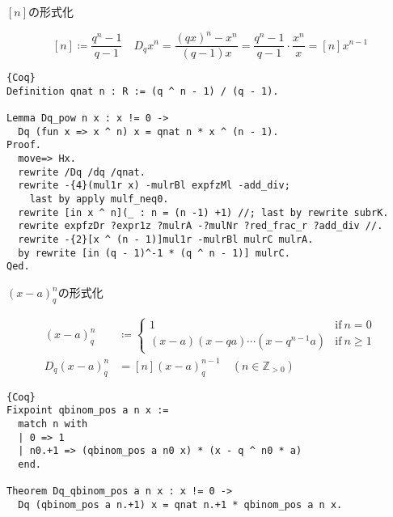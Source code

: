 \documentclass[dvipdfmx,cjk]{beamer}
\theoremstyle{mystyle}
\newcommand{\Z}{\mathbb{Z}}
\newcommand{\0}{\textbf{0}}
\begin{document}
\begin{frame}[fragile]{$[n]$の形式化}
	\begin{screen}
		\[
			[n] \coloneqq \frac{q^n - 1}{q - 1} \quad
			D_q x^n = \frac{(qx)^n - x^n}{(q - 1) x} = \frac{q^n - 1}{q - 1} \cdot \frac{x^n}{x}
							= [n] x^{n - 1}
		\]
	\end{screen} \pause
	\begin{lstlisting}{Coq}
Definition qnat n : R := (q ^ n - 1) / (q - 1).

Lemma Dq_pow n x : x != 0 ->
  Dq (fun x => x ^ n) x = qnat n * x ^ (n - 1).
Proof.
  move=> Hx.
  rewrite /Dq /dq /qnat.
  rewrite -{4}(mul1r x) -mulrBl expfzMl -add_div;
    last by apply mulf_neq0.
  rewrite [in x ^ n](_ : n = (n -1) +1) //; last by rewrite subrK.
  rewrite expfzDr ?expr1z ?mulrA -?mulNr ?red_frac_r ?add_div //.
  rewrite -{2}[x ^ (n - 1)]mul1r -mulrBl mulrC mulrA.
  by rewrite [in (q - 1)^-1 * (q ^ n - 1)] mulrC.
Qed. \end{lstlisting}
\end{frame}

\begin{frame}[fragile]{$(x - a)^n_q$の形式化}
	\begin{screen}
		\begin{align*}
			(x - a)^n_q &\coloneqq \begin{cases}
	                      1 & \text{if}\ n = 0 \\
	                      (x - a) (x - qa) \cdots (x - q^{n - 1} a) & \text{if}\ n \ge 1
	                    \end{cases} \\
			D_q (x - a)^n_q &= [n](x - a)^{n - 1}_q \quad (n \in \Z_{>0})
		\end{align*}
	\end{screen} \pause
	\begin{lstlisting}{Coq}
Fixpoint qbinom_pos a n x :=
  match n with
  | 0 => 1
  | n0.+1 => (qbinom_pos a n0 x) * (x - q ^ n0 * a)
  end. 
  
Theorem Dq_qbinom_pos a n x : x != 0 ->
  Dq (qbinom_pos a n.+1) x = qnat n.+1 * qbinom_pos a n x. \end{lstlisting}
\end{frame}

%
\end{document}

